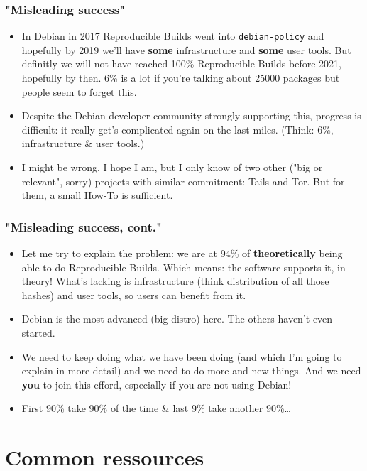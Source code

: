 \documentclass[14pt,aspectratio=169]{beamer}
\begin{document}
\begin{frame}
 \frametitle{"Misleading success"}
 \begin{itemize}
	 \item<2-4> In Debian in 2017 Reproducible Builds went into \texttt{debian-policy} and hopefully by 2019 we'll have \textbf{some} infrastructure and \textbf{some} user tools. But definitly we will not have reached 100\% Reproducible Builds before 2021, hopefully by then. 6\% is a lot if you're talking about 25000 packages but people seem to forget this.
	 \item<3-4> Despite the Debian developer community strongly supporting this, progress is difficult: it really get's complicated again on the last miles. (Think: 6\%, infrastructure \& user tools.)
	 \item<4> I might be wrong, I hope I am, but I only know of two other ("big or relevant", sorry) projects with similar commitment: Tails and Tor. But for them, a small How-To is sufficient.
 \end{itemize}
\end{frame}

\begin{frame}
 \frametitle{"Misleading success, cont."}
 \begin{itemize}
 \item Let me try to explain the problem: we are at 94\% of \textbf{theoretically} being able to do Reproducible Builds. Which means: the software supports it, in theory! What's lacking is infrastructure (think distribution of all those hashes) and user tools, so users can benefit from it.
 \item<2-4> Debian is the most advanced (big distro) here. The others haven't even started.
 \item<3-4> We need to keep doing what we have been doing (and which I'm going to explain in more detail) and we need to do more and new things. And we need \textbf{you} to join this efford, especially if you are not using Debian!
 \item<4> First 90\% take 90\% of the time \& last 9\% take another 90\%…

 \end{itemize}
\end{frame}

\section{Common ressources}
\end{document}

